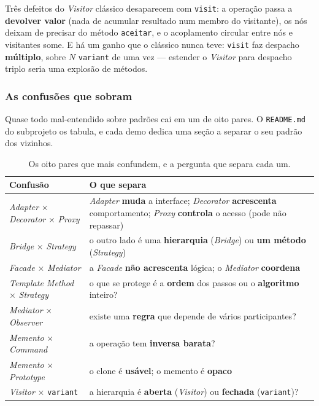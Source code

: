Três defeitos do \emph{Visitor} clássico desaparecem com \texttt{visit}: a
operação passa a \textbf{devolver valor} (nada de acumular resultado num membro
do visitante), os nós deixam de precisar do método \texttt{aceitar}, e o
acoplamento circular entre nós e visitantes some. E há um ganho que o clássico
nunca teve: \texttt{visit} faz despacho \textbf{múltiplo}, sobre $N$
\texttt{variant} de uma vez --- estender o \emph{Visitor} para despacho triplo
seria uma explosão de métodos.

\subsubsection{As confusões que sobram}

Quase todo mal-entendido sobre padrões cai em um de oito pares. O
\texttt{README.md} do subprojeto os tabula, e cada demo dedica uma seção a
separar o seu padrão dos vizinhos.

\begin{table}[htbp]
\centering
\caption{Os oito pares que mais confundem, e a pergunta que separa cada um.}
\label{tab:confusoes}
\footnotesize
\begin{tabular}{@{}lp{}@{}}
\toprule
\textbf{Confusão} & \textbf{O que separa} \\
\midrule
\emph{Adapter} $\times$ \emph{Decorator} $\times$ \emph{Proxy} &
  \emph{Adapter} \textbf{muda} a interface; \emph{Decorator} \textbf{acrescenta} comportamento; \emph{Proxy} \textbf{controla} o acesso (pode não repassar) \\
\emph{Bridge} $\times$ \emph{Strategy} &
  o outro lado é uma \textbf{hierarquia} (\emph{Bridge}) ou \textbf{um método} (\emph{Strategy}) \\
\emph{Facade} $\times$ \emph{Mediator} &
  a \emph{Facade} \textbf{não acrescenta} lógica; o \emph{Mediator} \textbf{coordena} \\
\emph{Template Method} $\times$ \emph{Strategy} &
  o que se protege é a \textbf{ordem} dos passos ou o \textbf{algoritmo} inteiro? \\
\emph{Mediator} $\times$ \emph{Observer} &
  existe uma \textbf{regra} que depende de vários participantes? \\
\emph{Memento} $\times$ \emph{Command} &
  a operação tem \textbf{inversa barata}? \\
\emph{Memento} $\times$ \emph{Prototype} &
  o clone é \textbf{usável}; o memento é \textbf{opaco} \\
\emph{Visitor} $\times$ \texttt{variant} &
  a hierarquia é \textbf{aberta} (\emph{Visitor}) ou \textbf{fechada} (\texttt{variant})? \\
\bottomrule
\end{tabular}
\end{table}

